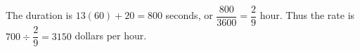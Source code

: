 The duration is $13(60)+20=800$ seconds, or $\dfrac{800}{3600}=\dfrac{2}{9}$ hour. Thus the rate is $700\div\dfrac{2}{9}=\boxed{3150}$ dollars per hour.
